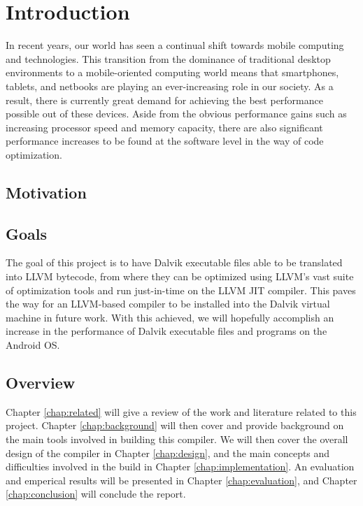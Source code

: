 \chapter{Introduction}

In recent years, our world has seen a continual shift towards mobile computing and technologies. This transition from the dominance of traditional desktop environments to a mobile-oriented computing world means that smartphones, tablets, and netbooks are playing an ever-increasing role in our society. As a result, there is currently great demand for achieving the best performance possible out of these devices. Aside from the obvious performance gains such as increasing processor speed and memory capacity, there are also significant performance increases to be found at the software level in the way of code optimization.

\section{Motivation}

\section{Goals}

The goal of this project is to have Dalvik executable files able to be translated into LLVM bytecode, from where they can be optimized using LLVM's vast suite of optimization tools and run just-in-time on the LLVM JIT compiler. This paves the way for an LLVM-based compiler to be installed into the Dalvik virtual machine in future work. With this achieved, we will hopefully accomplish an increase in the performance of Dalvik executable files and programs on the Android OS.

\section{Overview}

Chapter \ref{chap:related} will give a review of the work and literature related to this project. Chapter \ref{chap:background} will then cover and provide background on the main tools involved in building this compiler. We will then cover the overall design of the compiler in Chapter \ref{chap:design}, and the main concepts and difficulties involved in the build in Chapter \ref{chap:implementation}. An evaluation and emperical results will be presented in Chapter \ref{chap:evaluation}, and Chapter \ref{chap:conclusion} will conclude the report.
